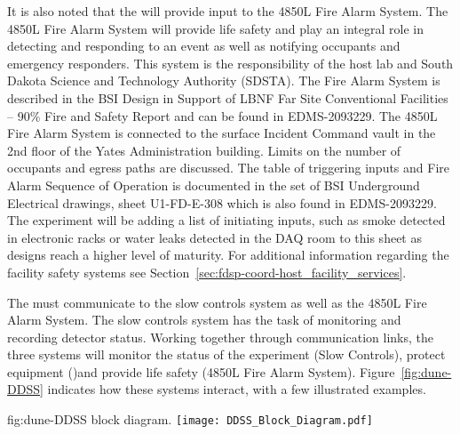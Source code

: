 It is also noted that the  will provide input to the 4850L
Fire Alarm System.  The 4850L Fire Alarm System will provide life
safety and play an integral role in detecting and responding to an
event as well as notifying occupants and emergency responders.  This
system is the responsibility of the host lab and South Dakota Science
and Technology Authority (SDSTA).  The Fire Alarm System is described
in the BSI Design in Support of LBNF Far Site Conventional Facilities
-- 90\% Fire and Safety Report and can be found in EDMS-2093229. The
4850L Fire Alarm System is connected to the surface Incident Command
vault in the 2nd floor of the Yates Administration building. Limits on
the number of occupants and egress paths are discussed. The table of
triggering inputs and Fire Alarm Sequence of Operation is documented
in the set of BSI Underground Electrical drawings, sheet U1-FD-E-308
which is also found in EDMS-2093229. The experiment will be adding a
list of initiating inputs, such as smoke detected in electronic racks
or water leaks detected in the DAQ room to this sheet as designs reach
a higher level of maturity. For additional information regarding the
facility safety systems see Section~\ref{sec:fdsp-coord-host_facility_services}.
 
The  must communicate to the  slow controls
system as well as the 4850L Fire Alarm System.  The  slow
controls system has the task of monitoring and recording detector
status.  Working together through communication links, the three
systems will monitor the status of the experiment (Slow Controls),
protect equipment ()and provide life safety (4850L Fire
Alarm System). Figure~\ref{fig:dune-DDSS} indicates how these systems
interact, with a few illustrated examples.
\begin{dunefigure}{fig:dune-DDSS}
  { block diagram.}
  \texttt{[image: DDSS\_Block\_Diagram.pdf]}
\end{dunefigure}


